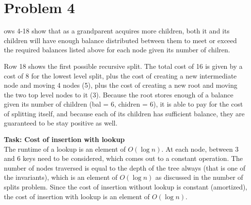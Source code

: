 \documentclass[12pt,letterpaper]{article}
\newcommand\hwnum{}                  %
\newenvironment{answer}[2]{
  \section*{Problem \hwnum#1}
}{\newpage}
\begin{document}
\begin{answer}{4}
Rows 4-18 show that as a grandparent acquires more children, both it and its children will have enough balance distributed between them to meet or exceed the required balances listed above for each node given its number of chilren. 

Row 18 shows the first possible recursive split. The total cost of 16 is given by a cost of 8 for the lowest level split, plus the cost of creating a new intermediate node and moving 4 nodes (5), plus the cost of creating a new root and moving the two top level nodes to it (3). Because the root stores enough of a balance given its number of children (bal = 6, chidren = 6), it is able to pay for the cost of splitting itself, and because each of its children has sufficient balance, they are guaranteed to be stay positive as well.





\textbf{Task: Cost of insertion with lookup}\\
The runtime of a lookup is an element of $O(\log n)$. At each node, between 3 and 6 keys need to be considered, which comes out to a constant operation. The number of nodes traversed is equal to the depth of the tree always (that is one of the invariants), which is an element of $O(\log n)$ as discussed in the number of splits problem. Since the cost of insertion without lookup is constant (amortized), the cost of insertion with lookup is an element of $O(\log n)$.



\end{answer}
\end{document}
